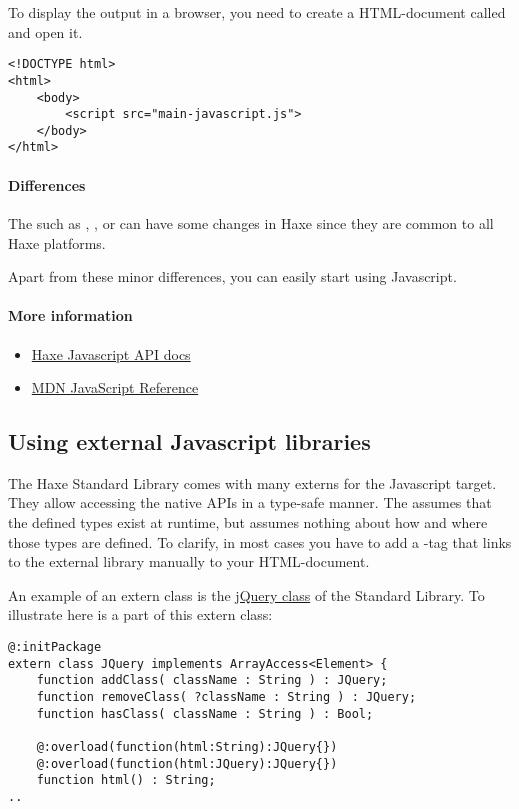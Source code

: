 To display the output in a browser, you need to create a HTML-document called  and open it.

\begin{lstlisting}
<!DOCTYPE html>
<html>
	<body>
		<script src="main-javascript.js">
	</body>
</html>
\end{lstlisting}

\paragraph{Differences}

The  such as , ,  or  can have some changes in Haxe since they are common to all Haxe platforms.

Apart from these minor differences, you can easily start using Javascript.  

\paragraph{More information}

\begin{itemize}
	\item \href{http://api.haxe.org/js/}{Haxe Javascript API docs}
	\item \href{https://developer.mozilla.org/en-US/docs/Web/JavaScript/Reference}{MDN JavaScript Reference}
\end{itemize}

\subsection{Using external Javascript libraries}
\label{target-javascript-external-libraries}

The Haxe Standard Library comes with many externs for the Javascript target. They allow accessing the native APIs in a type-safe manner.
The  assumes that the defined types exist at runtime, but assumes nothing about how and where those types are defined. 
To clarify, in most cases you have to add a -tag that links to the external library manually to your HTML-document.


An example of an extern class is the \href{https://github.com/HaxeFoundation/haxe/blob/development/std/js/JQuery.hx#L83}{jQuery class} of the Standard Library. 
To illustrate here is a part of this extern class:

\begin{lstlisting}
@:initPackage
extern class JQuery implements ArrayAccess<Element> {
	function addClass( className : String ) : JQuery;
	function removeClass( ?className : String ) : JQuery;
	function hasClass( className : String ) : Bool;
	
	@:overload(function(html:String):JQuery{})
	@:overload(function(html:JQuery):JQuery{})
	function html() : String;
..
\end{lstlisting}

